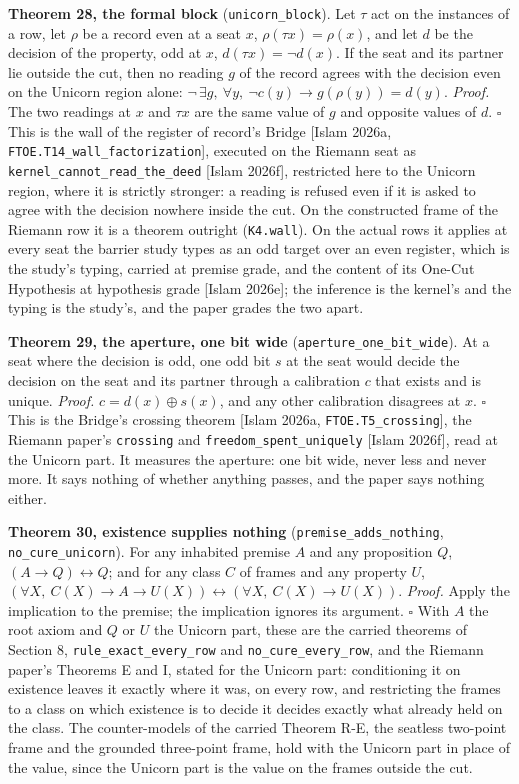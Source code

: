 \documentclass[10pt]{article}
\begin{document}
\textbf{Theorem 28, the formal block} (\texttt{unicorn\_block}). Let
\(\tau\) act on the instances of a row, let \(\rho\) be a record even at
a seat \(x\), \(\rho(\tau x) = \rho(x)\), and let \(d\) be the decision
of the property, odd at \(x\), \(d(\tau x) = \neg d(x)\). If the seat
and its partner lie outside the cut, then no reading \(g\) of the record
agrees with the decision even on the Unicorn region alone:
\(\neg\,\exists g,\ \forall y,\ \neg c(y) \to g(\rho(y)) = d(y)\).
\emph{Proof.} The two readings at \(x\) and \(\tau x\) are the same
value of \(g\) and opposite values of \(d\). \(\square\) This is the
wall of the register of record's Bridge {[}Islam 2026a,
\texttt{FTOE.T14\_wall\_factorization}{]}, executed on the Riemann seat
as \texttt{kernel\_cannot\_read\_the\_deed} {[}Islam 2026f{]},
restricted here to the Unicorn region, where it is strictly stronger: a
reading is refused even if it is asked to agree with the decision
nowhere inside the cut. On the constructed frame of the Riemann row it
is a theorem outright (\texttt{K4.wall}). On the actual rows it applies
at every seat the barrier study types as an odd target over an even
register, which is the study's typing, carried at premise grade, and the
content of its One-Cut Hypothesis at hypothesis grade {[}Islam 2026e{]};
the inference is the kernel's and the typing is the study's, and the
paper grades the two apart.

\textbf{Theorem 29, the aperture, one bit wide}
(\texttt{aperture\_one\_bit\_wide}). At a seat where the decision is
odd, one odd bit \(s\) at the seat would decide the decision on the seat
and its partner through a calibration \(c\) that exists and is unique.
\emph{Proof.} \(c = d(x) \oplus s(x)\), and any other calibration
disagrees at \(x\). \(\square\) This is the Bridge's crossing theorem
{[}Islam 2026a, \texttt{FTOE.T5\_crossing}{]}, the Riemann paper's
\texttt{crossing} and \texttt{freedom\_spent\_uniquely} {[}Islam
2026f{]}, read at the Unicorn part. It measures the aperture: one bit
wide, never less and never more. It says nothing of whether anything
passes, and the paper says nothing either.

\textbf{Theorem 30, existence supplies nothing}
(\texttt{premise\_adds\_nothing}, \texttt{no\_cure\_unicorn}). For any
inhabited premise \(A\) and any proposition \(Q\),
\((A \to Q) \leftrightarrow Q\); and for any class \(C\) of frames and
any property \(U\),
\((\forall X,\ C(X) \to A \to U(X)) \leftrightarrow (\forall X,\ C(X) \to U(X))\).
\emph{Proof.} Apply the implication to the premise; the implication
ignores its argument. \(\square\) With \(A\) the root axiom and \(Q\) or
\(U\) the Unicorn part, these are the carried theorems of Section 8,
\texttt{rule\_exact\_every\_row} and \texttt{no\_cure\_every\_row}, and
the Riemann paper's Theorems E and I, stated for the Unicorn part:
conditioning it on existence leaves it exactly where it was, on every
row, and restricting the frames to a class on which existence is to
decide it decides exactly what already held on the class. The
counter-models of the carried Theorem R-E, the seatless two-point frame
and the grounded three-point frame, hold with the Unicorn part in place
of the value, since the Unicorn part is the value on the frames outside
the cut.
\end{document}
